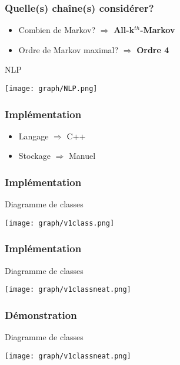 \documentclass{beamer}
\begin{document}
            \begin{frame}
                \frametitle{Quelle(s) chaîne(s) considérer?}
                \begin{itemize}
                    \pause[2]
                    \item Combien de Markov? \pause[3] $\Rightarrow$ \textbf{All-k}$^{th}$\textbf{-Markov}
                    \pause[4]
                    \item Ordre de Markov maximal? \pause[6] $\Rightarrow$ \textbf{Ordre 4}
                    \pause[5]
                \end{itemize}
                \begin{exampleblock}{NLP}
                    \begin{center}
                        \texttt{[image: graph/NLP.png]}
                    \end{center}
                \end{exampleblock}
            \end{frame}
            \begin{frame}
                \frametitle{Implémentation}
                \begin{itemize}
                    \pause
                    \item Langage  \pause $\Rightarrow$ C++
                    \pause
                    \item Stockage \pause $\Rightarrow$ Manuel
                \end{itemize}
            \end{frame}
            \begin{frame}
                \frametitle{Implémentation}
                \pause
                \begin{block}{Diagramme de classes}
                    \begin{center}
                        \texttt{[image: graph/v1class.png]}
                    \end{center}
                \end{block}
            \end{frame}
            \begin{frame}
                \frametitle{Implémentation}
                \begin{block}{Diagramme de classes}
                    \begin{center}
                        \texttt{[image: graph/v1classneat.png]}
                    \end{center}
                \end{block}
            \end{frame}
            \begin{frame}
                \frametitle{Démonstration}
            \end{frame}
                \begin{block}{Diagramme de classes}
                    \begin{center}
                        \texttt{[image: graph/v1classneat.png]}
                    \end{center}
                \end{block}
\end{document}
